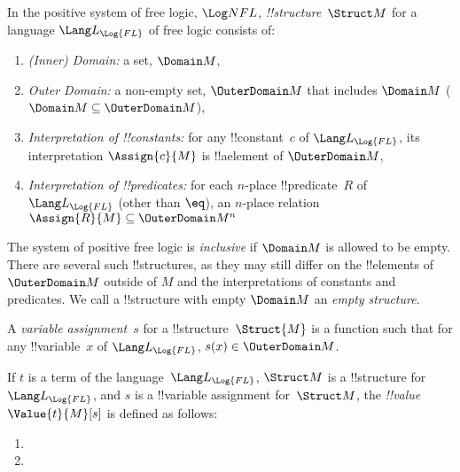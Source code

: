 \documentclass[../../../../include/open-logic-section]{subfiles}
\begin{document}
\begin{defn}[!!^{structure}s]
    In the positive system of free logic, $\Log NFL$,
     \emph{!!{structure}}~$\Struct M$ for a language
    $\Lang L_{\Log{FL}}$ of free logic consists of:
    \begin{enumerate}
    \item \emph{(Inner) Domain:} a set, $\Domain M$,
    \item \emph{Outer Domain:} a non-empty set, $\OuterDomain M$ that
        includes $\Domain M$ ($\Domain M \subseteq \OuterDomain M $),
    \item \emph{Interpretation of !!{constant}s:} for any !!{constant}~$c$ of
      $\Lang L_{\Log{FL}}$, its interpretation $\Assign{c}{M}$ is !!a{element} of 
      $\OuterDomain M$,
    \item \emph{Interpretation of !!{predicate}s:} for each $n$-place
      !!{predicate}~$R$ of $\Lang L_{\Log{FL}}$ (other than $\eq$), an $n$-place
      relation $\Assign{R}{M} \subseteq \OuterDomain M^n$
    \end{enumerate}
    The system of positive free logic is \emph{inclusive} if $\Domain M$ is
    allowed to be empty. There are several such !!{structure}s, as they may
    still differ on the !!{element}s of $\OuterDomain M$ outside of $M$ and the 
    interpretations of constants and predicates. We call a !!{structure} with
    empty $\Domain M$ an \emph{empty structure}. 
\end{defn}
    
\begin{defn}
    A \emph{variable assignment}~$s$ for a !!{structure}~$\Struct{M}$ is a
      function such that for any !!{variable}~$x$ of
      $\Lang L_{\Log{FL}}$, $s(x) \in \OuterDomain M$. 
\end{defn}
    
\begin{defn}
    If $t$ is a term of the language~$\Lang L_{\Log{FL}}$, $\Struct M$ is a
    !!{structure} for~$\Lang L_{\Log{FL}}$, and $s$ is a !!{variable} assignment
    for~$\Struct M$, the \emph{!!{value}}~$\Value{t}{M}[s]$ is defined as
    follows:
    \begin{enumerate}
    \item {}
    \item {}
    \end{enumerate}
\end{defn}
    
\end{document}
